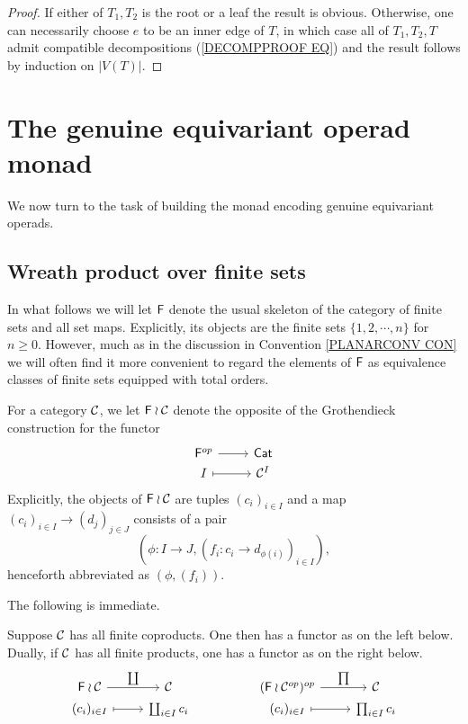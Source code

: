 \documentclass[a4paper,10pt]{article}%
\begin{document}
\begin{proof}
  If either of $T_1,T_2$ is the root or a leaf the result is obvious. Otherwise, one can necessarily choose $e$ to be an inner edge of $T$, in which case all of $T_1,T_2,T$ admit compatible decompositions (\ref{DECOMPPROOF EQ}) and the result follows by induction on $|V(T)|$.
\end{proof}



\section{The genuine equivariant operad monad}

We now turn to the task of building the monad encoding genuine equivariant operads.



\subsection{Wreath product over finite sets}

In what follows we will let $\mathsf{F}$ denote the usual skeleton of the category of finite sets and all set maps. Explicitly, its objects are the finite sets $\{1,2,\cdots,n\}$ for $n\geq 0$.
However, much as in the discussion in 
Convention \ref{PLANARCONV CON} we will often find it more convenient to regard the elements of $\mathsf{F}$ as equivalence classes of finite sets equipped with total orders.


\begin{definition}
  For a category $\mathcal{C}$, we let $\mathsf{F} \wr \mathcal{C}$ denote the opposite of the Grothendieck construction for the functor
  \[
  \begin{tikzcd}[row sep=0pt]
    \Fin^{op} \ar{r} & \mathsf{Cat}
    \\
    I \ar[r,mapsto] & \C^I
  \end{tikzcd}	
  \]
  Explicitly, the objects of $\mathsf{F} \wr \mathcal{C}$ are tuples $(c_i)_{i \in I}$ and a map 
  $(c_i)_{i \in I} \to (d_j)_{j \in J}$ consists of a pair 
  \[(\phi \colon I \to J, (f_i\colon c_i \to d_{\phi(i)})_{i\in I}),\]
  henceforth abbreviated as $(\phi,(f_i))$.
\end{definition}

The following is immediate.

\begin{proposition}
  Suppose $\mathcal{C}$ has all finite coproducts. One then has a functor as on the left below.
  Dually, if $\mathcal{C}$ has all finite products, one has a functor as on the right below.
  \[
  \begin{tikzcd}[row sep=0pt]
    \Fin \wr \C \ar{r}{\coprod} & \C & &
    (\Fin \wr \C^{op})^{op} \ar{r}{\prod} & \C
    \\
    (c_i)_{i \in I} \ar[mapsto]{r} & \coprod_{i \in I}{c_i} & &
    (c_i)_{i \in I} \ar[mapsto]{r} & \prod_{i \in I}{c_i}
  \end{tikzcd}
  \]
\end{proposition}
\end{document}
